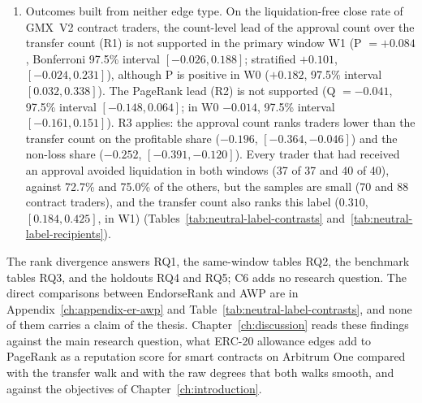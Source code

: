 \begin{enumerate}
\item[C6.] Outcomes built from neither edge type. On the liquidation-free close rate of GMX~V2 contract traders, the count-level lead of the approval count over the transfer count (R1) is not supported in the primary window W1 (P $=+0.084$, Bonferroni 97.5\% interval $[-0.026,0.188]$; stratified $+0.101$, $[-0.024,0.231]$), although P is positive in W0 ($+0.182$, 97.5\% interval $[0.032,0.338]$). The PageRank lead (R2) is not supported (Q $=-0.041$, 97.5\% interval $[-0.148,0.064]$; in W0 $-0.014$, 97.5\% interval $[-0.161,0.151]$). R3 applies: the approval count ranks traders lower than the transfer count on the profitable share ($-0.196$, $[-0.364,-0.046]$) and the non-loss share ($-0.252$, $[-0.391,-0.120]$). Every trader that had received an approval avoided liquidation in both windows (37 of 37 and 40 of 40), against 72.7\% and 75.0\% of the others, but the samples are small (70 and 88 contract traders), and the transfer count also ranks this label ($0.310$, $[0.184,0.425]$, in W1) (Tables~\ref{tab:neutral-label-contrasts} and~\ref{tab:neutral-label-recipients}).
\end{enumerate}

The rank divergence answers RQ1, the same-window tables RQ2, the benchmark tables RQ3, and the holdouts RQ4 and RQ5; C6 adds no research question. The direct comparisons between EndorseRank and AWP are in Appendix~\ref{ch:appendix-er-awp} and Table~\ref{tab:neutral-label-contrasts}, and none of them carries a claim of the thesis. Chapter~\ref{ch:discussion} reads these findings against the main research question, what ERC-20 allowance edges add to PageRank as a reputation score for smart contracts on Arbitrum One compared with the transfer walk and with the raw degrees that both walks smooth, and against the objectives of Chapter~\ref{ch:introduction}.
